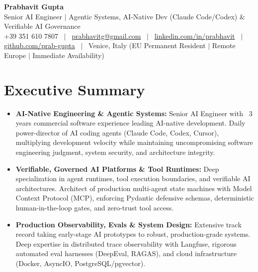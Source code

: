 \documentclass[a4paper,10pt]{article}
\begin{document}
\begin{minipage}[c]{0.80\textwidth}
  {\Huge\bfseries Prabhavit Gupta}\\[3pt]
  {\color{accent}\large Senior AI Engineer $\vert$ Agentic Systems, AI-Native Dev (Claude Code/Codex) $\&$ Verifiable AI Governance}\\[6pt]
  {\footnotesize +39 351 610 7807 ~$\vert$~
  \href{mailto:prabhavitg@gmail.com}{prabhavitg@gmail.com} ~$\vert$~
  \href{https://www.linkedin.com/in/prabhavit/}{linkedin.com/in/prabhavit} ~$\vert$~
  \href{https://github.com/prab-gupta}{github.com/prab-gupta} ~$\vert$~
  Venice, Italy (EU Permanent Resident $\vert$ Remote Europe $\vert$ Immediate Availability)}
\end{minipage}\hfill

\vspace{6pt}

\section{Executive Summary}
\begin{itemize}
  \item \textbf{AI-Native Engineering \& Agentic Systems:} Senior AI Engineer with ~3 years commercial software experience leading AI-native development. Daily power-director of AI coding agents (Claude Code, Codex, Cursor), multiplying development velocity while maintaining uncompromising software engineering judgment, system security, and architecture integrity.
  \item \textbf{Verifiable, Governed AI Platforms \& Tool Runtimes:} Deep specialization in agent runtimes, tool execution boundaries, and verifiable AI architectures. Architect of production multi-agent state machines with Model Context Protocol (MCP), enforcing Pydantic defensive schemas, deterministic human-in-the-loop gates, and zero-trust tool access.
  \item \textbf{Production Observability, Evals \& System Design:} Extensive track record taking early-stage AI prototypes to robust, production-grade systems. Deep expertise in distributed trace observability with Langfuse, rigorous automated eval harnesses (DeepEval, RAGAS), and cloud infrastructure (Docker, AsyncIO, PostgreSQL/pgvector).
\end{itemize}

\end{document}

